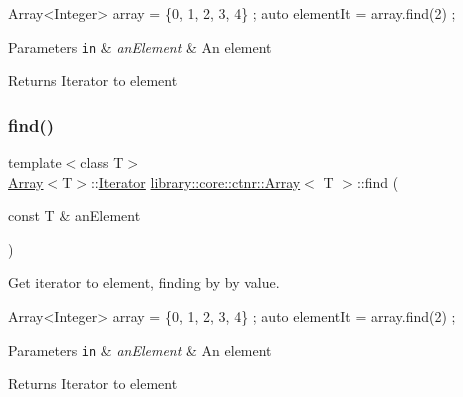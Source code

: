 \begin{DoxyCode}
Array<Integer> array = \{0, 1, 2, 3, 4\} ;
\textcolor{keyword}{auto} elementIt = array.find(2) ;
\end{DoxyCode}



\begin{DoxyParams}[1]{Parameters}
\mbox{\tt in}  & {\em an\+Element} & An element \\
\hline
\end{DoxyParams}
\begin{DoxyReturn}{Returns}
Iterator to element 
\end{DoxyReturn}
\mbox{\label{classlibrary_1_1core_1_1ctnr_1_1_array_afece85f642e3c623bac197e25ad2d4ec}} 
\subsubsection{\texorpdfstring{find()}{find()}\hspace{0.1cm}{\footnotesize\ttfamily [2/2]}}
{\footnotesize\ttfamily template$<$class T$>$ \\
\hyperlink{classlibrary_1_1core_1_1ctnr_1_1_array}{Array}$<$T$>$\+::\hyperlink{classlibrary_1_1core_1_1ctnr_1_1_array_a2364a34e7bc76d3661c3d89c4729a0e4}{Iterator} \hyperlink{classlibrary_1_1core_1_1ctnr_1_1_array}{library\+::core\+::ctnr\+::\+Array}$<$ T $>$\+::find (\begin{DoxyParamCaption}\item[{const T \&}]{an\+Element }\end{DoxyParamCaption})}



Get iterator to element, finding by by value. 


\begin{DoxyCode}
Array<Integer> array = \{0, 1, 2, 3, 4\} ;
\textcolor{keyword}{auto} elementIt = array.find(2) ;
\end{DoxyCode}



\begin{DoxyParams}[1]{Parameters}
\mbox{\tt in}  & {\em an\+Element} & An element \\
\hline
\end{DoxyParams}
\begin{DoxyReturn}{Returns}
Iterator to element 
\end{DoxyReturn}
\mbox{\label{classlibrary_1_1core_1_1ctnr_1_1_array_aa8a3e2745d72db8181b42e3cfb55415c}} 
